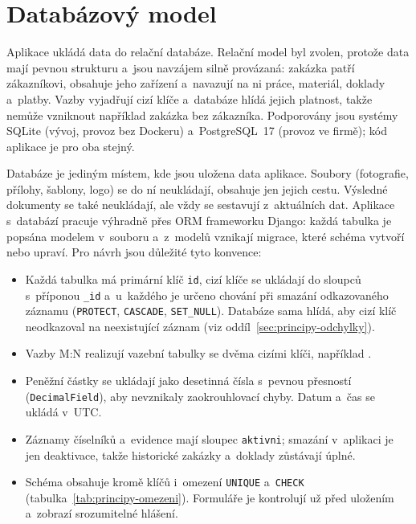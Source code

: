 \section{Databázový model}\label{sec:databaze}

Aplikace ukládá data do relační databáze. Relační model byl zvolen, protože data mají pevnou strukturu a~jsou navzájem silně provázaná: zakázka patří zákazníkovi, obsahuje jeho zařízení a~navazují na ni práce, materiál, doklady a~platby. Vazby vyjadřují cizí klíče a~databáze hlídá jejich platnost, takže nemůže vzniknout například zakázka bez zákazníka. Podporovány jsou systémy SQLite (vývoj, provoz bez Dockeru) a~PostgreSQL~17 (provoz ve firmě); kód aplikace je pro oba stejný.

Databáze je jediným místem, kde jsou uložena data aplikace. Soubory (fotografie, přílohy, šablony, logo) se do ní neukládají, obsahuje jen jejich cestu. Výsledné dokumenty se také neukládají, ale vždy se sestavují z~aktuálních dat. Aplikace s~databází pracuje výhradně přes ORM frameworku Django: každá tabulka je popsána modelem v~souboru  a~z~modelů vznikají migrace, které schéma vytvoří nebo upraví. Pro návrh jsou důležité tyto konvence:

\begin{itemize}
\item Každá tabulka má primární klíč \texttt{id}, cizí klíče se ukládají do sloupců s~příponou \texttt{\_id} a~u~každého je určeno chování při smazání odkazovaného záznamu (\texttt{PROTECT}, \texttt{CASCADE}, \texttt{SET\_NULL}). Databáze sama hlídá, aby cizí klíč neodkazoval na neexistující záznam (viz oddíl~\ref{sec:principy-odchylky}).
\item Vazby M:N realizují vazební tabulky se dvěma cizími klíči, například .
\item Peněžní částky se ukládají jako desetinná čísla s~pevnou přesností (\texttt{DecimalField}), aby nevznikaly zaokrouhlovací chyby. Datum a~čas se ukládá v~UTC.
\item Záznamy číselníků a~evidence mají sloupec \texttt{aktivni}; smazání v~aplikaci je jen deaktivace, takže historické zakázky a~doklady zůstávají úplné.
\item Schéma obsahuje kromě klíčů i~omezení \texttt{UNIQUE} a~\texttt{CHECK} (tabulka~\ref{tab:principy-omezeni}). Formuláře je kontrolují už před uložením a~zobrazí srozumitelné hlášení.
\end{itemize}

